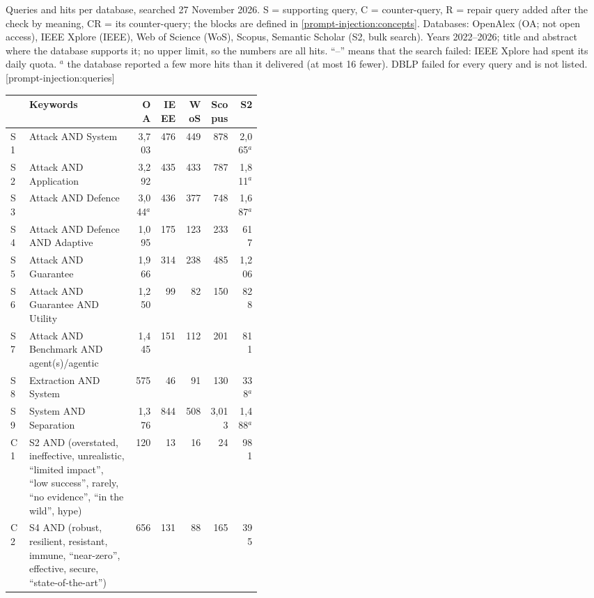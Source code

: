 \begin{table}[tbp]
  \begin{sidecaption}{Queries and hits per database, searched 27 November
    2026. S = supporting query, C = counter-query, R = repair query added
    after the check by meaning, CR = its counter-query; the blocks are
    defined in \cref{prompt-injection:concepts}. Databases: OpenAlex (OA;
    not open access), IEEE Xplore (IEEE), Web of Science (WoS), Scopus,
    Semantic Scholar (S2, bulk search). Years 2022--2026; title and
    abstract where the database supports it; no upper limit, so the
    numbers are all hits. \enquote{--} means that the search failed: IEEE
    Xplore had spent its daily quota. $^{a}$ the database reported a few
    more hits than it delivered (at most 16 fewer). DBLP failed for every
    query and is not listed.}[prompt-injection:queries]
    \centering\footnotesize
    \begin{tabular}{@{}lp{0.42\linewidth}rrrrr@{}}
      \toprule
      & Keywords & OA & IEEE & WoS & Scopus & S2 \\
      \midrule
      S1 & Attack AND System & 3{,}703 & 476 & 449 & 878 & 2{,}065$^{a}$ \\
      S2 & Attack AND Application & 3{,}292 & 435 & 433 & 787 & 1{,}811$^{a}$ \\
      S3 & Attack AND Defence & 3{,}044$^{a}$ & 436 & 377 & 748 & 1{,}687$^{a}$ \\
      S4 & Attack AND Defence AND Adaptive & 1{,}095 & 175 & 123 & 233 & 617 \\
      S5 & Attack AND Guarantee & 1{,}966 & 314 & 238 & 485 & 1{,}206 \\
      S6 & Attack AND Guarantee AND Utility & 1{,}250 & 99 & 82 & 150 & 828 \\
      S7 & Attack AND Benchmark AND agent(s)/agentic & 1{,}445 & 151 & 112 & 201 & 811 \\
      S8 & Extraction AND System & 575 & 46 & 91 & 130 & 338$^{a}$ \\
      S9 & System AND Separation & 1{,}376 & 844 & 508 & 3{,}013 & 1{,}488$^{a}$ \\
      C1 & S2 AND (overstated, ineffective, unrealistic, \enquote{limited impact}, \enquote{low success}, rarely, \enquote{no evidence}, \enquote{in the wild}, hype) & 120 & 13 & 16 & 24 & 981 \\
      C2 & S4 AND (robust, resilient, resistant, immune, \enquote{near-zero}, effective, secure, \enquote{state-of-the-art}) & 656 & 131 & 88 & 165 & 395 \\

\end{tabular}
\end{sidecaption}
\end{table}
